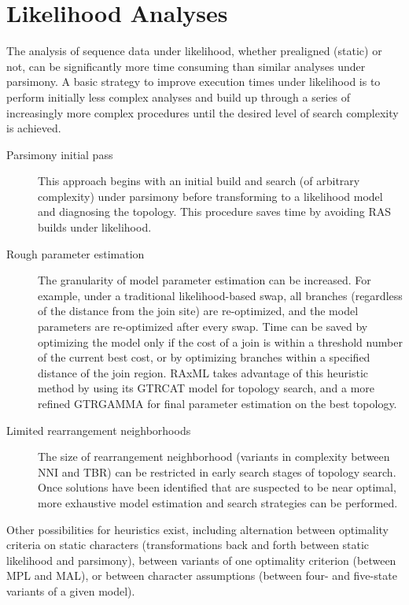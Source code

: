 \section{Likelihood Analyses}
The analysis of sequence data under likelihood, whether prealigned (static) or not, can be significantly more time consuming than 
similar analyses under parsimony.  A basic strategy to improve execution times under likelihood
is to perform initially less complex analyses and build up through a series of increasingly more complex procedures
until the desired level of search complexity is achieved.  
\begin{description}
\item[Parsimony initial pass] This approach begins with an initial build and search (of arbitrary complexity) under parsimony before 
transforming to a likelihood model and diagnosing the topology. This procedure saves time by avoiding RAS builds under likelihood. 
\item[Rough parameter estimation] The granularity of model parameter estimation can be increased. For example, under a traditional 
likelihood-based swap, all branches (regardless of the distance from the join site) are re-optimized, and the model parameters are 
re-optimized after every swap. Time can be saved by optimizing the model only if the cost of a join is within a threshold number 
of the current best cost, or by optimizing branches within a specified distance of the join region. RAxML takes advantage of this 
heuristic method by using its GTRCAT model for topology search, and a more refined GTRGAMMA for final parameter estimation 
on the best topology.
\item[Limited rearrangement neighborhoods] The size of rearrangement neighborhood (variants in complexity between NNI and TBR) 
can be restricted in early search stages of topology search. Once solutions have been identified that are suspected to be near optimal, 
more exhaustive model estimation and search strategies can be performed.
\end{description}
Other possibilities for heuristics exist, including alternation between optimality criteria on static characters (transformations back and 
forth between static likelihood and parsimony), between variants of one optimality criterion (between MPL and MAL), or between 
character assumptions (between four- and five-state variants of a given model). 

